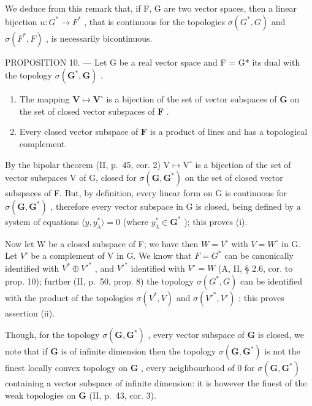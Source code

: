 We deduce from this remark that, if F, G are two vector spaces, then a linear bijection \(u:G^{*}\to F^{*}\) , that is continuous for the topologies \(\sigma(G^{*},G)\) and \(\sigma(F^{*},F)\) , is necessarily bicontinuous.

PROPOSITION 10. --- Let G be a real vector space and F = G* its dual with the topology \(\sigma(\mathbf{G}^*, \mathbf{G})\) .

\begin{enumerate}
\def\labelenumi{(\roman{enumi})}
\item
  The mapping \(\mathbf{V} \mapsto \mathbf{V}^{\circ}\) is a bijection of the set of vector subspaces of \(\mathbf{G}\) on the set of closed vector subspaces of \(\mathbf{F}\) .
\item
  Every closed vector subspace of \(\mathbf{F}\) is a product of lines and has a topological complement.
\end{enumerate}

By the bipolar theorem (II, p.~45, cor. 2) \(\mathrm{V} \mapsto \mathrm{V}^{\circ}\) is a bijection of the set of vector subspaces V of G, closed for \(\sigma(\mathbf{G}, \mathbf{G}^{*})\) on the set of closed vector subspaces of F. But, by definition, every linear form on G is continuous for \(\sigma(\mathbf{G}, \mathbf{G}^{*})\) , therefore every vector subspace in G is closed, being defined by a system of equations \(\langle y, y_{\lambda}^{*} \rangle = 0\) (where \(y_{\lambda}^{*} \in \mathbf{G}^{*}\) ); this proves (i).

Now let W be a closed subspace of F; we have then \(W = V^{\circ}\) with \(V = W^{\circ}\) in G. Let \(V'\) be a complement of V in G. We know that \(F = G^{*}\) can be canonically identified with \(V^{*} \oplus V'^{*}\) , and \(V'^{*}\) identified with \(V^{\circ} = W\) (A, II, § 2.6, cor. to prop. 10); further (II, p.~50, prop. 8) the topology \(\sigma(G^{*}, G)\) can be identified with the product of the topologies \(\sigma(V^{*}, V)\) and \(\sigma(V'^{*}, V')\) ; this proves assertion (ii).

Though, for the topology \(\sigma(\mathbf{G},\mathbf{G}^{*})\) , every vector subspace of \(\mathbf{G}\) is closed, we note that if \(\mathbf{G}\) is of infinite dimension then the topology \(\sigma(\mathbf{G},\mathbf{G}^{*})\) is not the finest locally convex topology on \(\mathbf{G}\) , every neighbourhood of 0 for \(\sigma(\mathbf{G},\mathbf{G}^{*})\) containing a vector subspace of infinite dimension: it is however the finest of the weak topologies on \(\mathbf{G}\) (II, p.~43, cor. 3).


